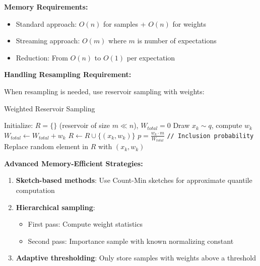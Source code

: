 \documentclass[11pt]{article}
\begin{document}
\textbf{Memory Requirements:}
\begin{itemize}
\item Standard approach: $O(n)$ for samples + $O(n)$ for weights
\item Streaming approach: $O(m)$ where $m$ is number of expectations
\item Reduction: From $O(n)$ to $O(1)$ per expectation
\end{itemize}

\textbf{Handling Resampling Requirement:}

When resampling is needed, use reservoir sampling with weights:

\begin{algorithm}
\caption{Weighted Reservoir Sampling}
\begin{algorithmic}[1]
\STATE Initialize: $R = \{\}$ (reservoir of size $m \ll n$), $W_{total} = 0$
    \STATE Draw $x_k \sim q$, compute $w_k$
    \STATE $W_{total} \gets W_{total} + w_k$
        \STATE $R \gets R \cup \{(x_k, w_k)\}$
    \ELSE
        \STATE $p = \frac{w_k \cdot m}{W_{total}}$ \texttt{// Inclusion probability}
            \STATE Replace random element in $R$ with $(x_k, w_k)$
        \ENDIF
    \ENDIF
\ENDWHILE
\end{algorithmic}
\end{algorithm}

\textbf{Advanced Memory-Efficient Strategies:}

\begin{enumerate}
\item \textbf{Sketch-based methods}: Use Count-Min sketches for approximate quantile computation
\item \textbf{Hierarchical sampling}: 
   \begin{itemize}
   \item First pass: Compute weight statistics
   \item Second pass: Importance sample with known normalizing constant
   \end{itemize}
\item \textbf{Adaptive thresholding}: Only store samples with weights above a threshold
\end{enumerate}
\end{document}
